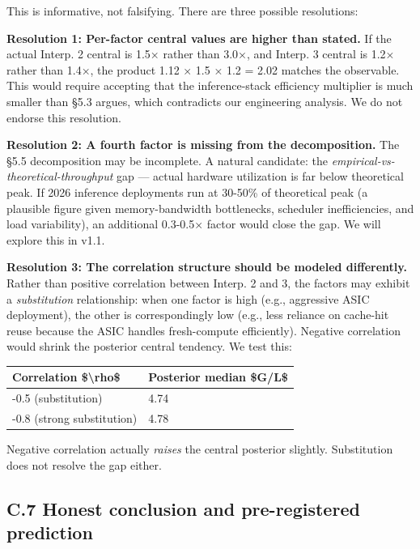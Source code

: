 \documentclass[11pt,a4paper]{article}
\begin{document}
This is informative, not falsifying. There are three possible resolutions:

\textbf{Resolution 1: Per-factor central values are higher than stated.} If the actual Interp. 2 central is 1.5× rather than 3.0×, and Interp. 3 central is 1.2× rather than 1.4×, the product 1.12 × 1.5 × 1.2 = 2.02 matches the observable. This would require accepting that the inference-stack efficiency multiplier is much smaller than §5.3 argues, which contradicts our engineering analysis. We do not endorse this resolution.

\textbf{Resolution 2: A fourth factor is missing from the decomposition.} The §5.5 decomposition may be incomplete. A natural candidate: the \emph{empirical-vs-theoretical-throughput} gap --- actual hardware utilization is far below theoretical peak. If 2026 inference deployments run at 30-50\% of theoretical peak (a plausible figure given memory-bandwidth bottlenecks, scheduler inefficiencies, and load variability), an additional 0.3-0.5× factor would close the gap. We will explore this in v1.1.

\textbf{Resolution 3: The correlation structure should be modeled differently.} Rather than positive correlation between Interp. 2 and 3, the factors may exhibit a \emph{substitution} relationship: when one factor is high (e.g., aggressive ASIC deployment), the other is correspondingly low (e.g., less reliance on cache-hit reuse because the ASIC handles fresh-compute efficiently). Negative correlation would shrink the posterior central tendency. We test this:

\begin{center}
\begin{tabular}{ll}
\toprule
Correlation \$\textbackslash{}rho\$ & Posterior median \$G/L\$ \\
\midrule
-0.5 (substitution) & 4.74 \\
-0.8 (strong substitution) & 4.78 \\
\bottomrule
\end{tabular}
\end{center}


Negative correlation actually \emph{raises} the central posterior slightly. Substitution does not resolve the gap either.

\subsection{C.7 Honest conclusion and pre-registered prediction}
\end{document}
